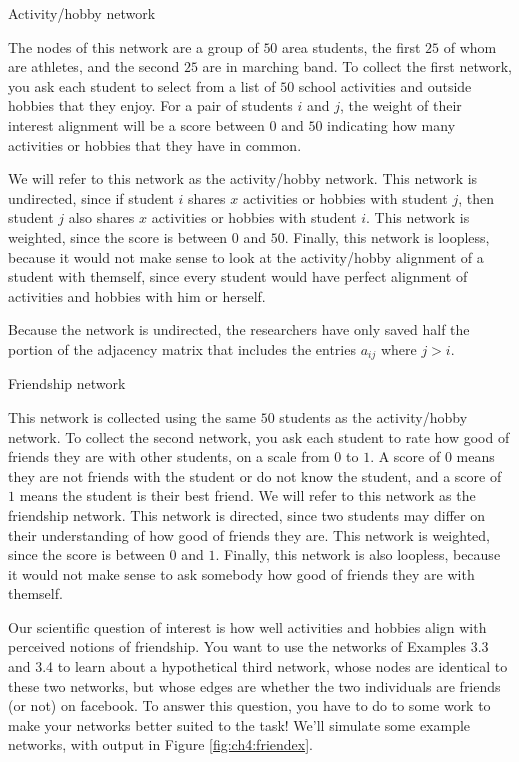 \begin{floatingbox}[h]\caption{Activity/hobby network}
The nodes of this network are a group of $50$ area students, the first $25$ of whom are athletes, and the second $25$ are in marching band. To collect the first network, you ask each student to select from a list of $50$ school activities and outside hobbies that they enjoy. For a pair of students $i$ and $j$, the weight of their interest alignment will be a score between $0$ and $50$ indicating how many activities or hobbies that they have in common. 

We will refer to this network as the activity/hobby network. This network is undirected, since if student $i$ shares $x$ activities or hobbies with student $j$, then student $j$ also shares $x$ activities or hobbies with student $i$. This network is weighted, since the score is between $0$ and $50$. Finally, this network is loopless, because it would not make sense to look at the activity/hobby alignment of a student with themself, since every student would have perfect alignment of activities and hobbies with him or herself. 

Because the network is undirected, the researchers have only saved half the portion of the adjacency matrix that includes the entries $a_{ij}$ where $j > i$.
\end{floatingbox}

\begin{floatingbox}[h]\caption{Friendship network}
This network is collected using the same $50$ students as the activity/hobby network. To collect the second network, you ask each student to rate how good of friends they are with other students, on a scale from $0$ to $1$. A score of $0$ means they are not friends with the student or do not know the student, and a score of $1$ means the student is their best friend. We will refer to this network as the friendship network. This network is directed, since two students may differ on their understanding of how good of friends they are. This network is weighted, since the score is between $0$ and $1$. Finally, this network is also loopless, because it would not make sense to ask somebody how good of friends they are with themself.
\end{floatingbox}

Our scientific question of interest is how well activities and hobbies align with perceived notions of friendship. You want to use the networks of Examples 3.3 and 3.4 to learn about a hypothetical third network, whose nodes are identical to these two networks, but whose edges are whether the two individuals are friends (or not) on facebook. To answer this question, you have to do to some work to make your networks better suited to the task! We'll simulate some example networks, with output in Figure \ref{fig:ch4:friendex}.

